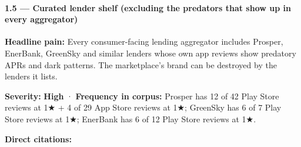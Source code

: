 \documentclass[
  10pt,
]{article}
\begin{document}
\hypertarget{curated-lender-shelf-excluding-the-predators-that-show-up-in-every-aggregator}{%
\paragraph{1.5 --- Curated lender shelf (excluding the predators that show up in every
aggregator)}\label{curated-lender-shelf-excluding-the-predators-that-show-up-in-every-aggregator}}

\textbf{Headline pain:} Every consumer-facing lending aggregator includes Prosper, EnerBank,
GreenSky and similar lenders whose own app reviews show predatory APRs and dark patterns. The
marketplace's brand can be destroyed by the lenders it lists.

\textbf{Severity:} \textbf{High} · \textbf{Frequency in corpus:} Prosper has 12 of 42 Play Store
reviews at 1★ + 4 of 29 App Store reviews at 1★; GreenSky has 6 of 7 Play Store reviews at 1★;
EnerBank has 6 of 12 Play Store reviews at 1★.

\textbf{Direct citations:}
\end{document}
